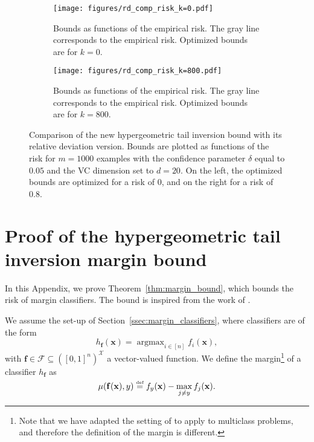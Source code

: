 \documentclass[twoside,11pt]{article}
\newcommand{\F}{\mathcal{F}}
\newcommand{\f}{\mathbf{f}}
\newcommand{\x}{\mathbf{x}}
\newcommand{\X}{\mathcal{X}}
\newcommand{\eqdef}{\overset{\smash{\mbox{\tiny \rm def}}}{=}}
\DeclareMathOperator*{\argmax}{argmax}
\begin{document}
\begin{figure}[h]
\centering
\begin{subfigure}[t]{0.485\textwidth}
    \centering
    \texttt{[image: figures/rd\_comp\_risk\_k=0.pdf]}
    \caption{Bounds as functions of the empirical risk. The gray line corresponds to the empirical risk. Optimized bounds are for $k=0$.}
    \label{fig:rd_comp_risk_k=0}
\end{subfigure}\hfill
\begin{subfigure}[t]{0.485\textwidth}
    \centering
    \texttt{[image: figures/rd\_comp\_risk\_k=800.pdf]}
    \caption{Bounds as functions of the empirical risk. The gray line corresponds to the empirical risk. Optimized bounds are for $k=800$.}
    \label{fig:rd_comp_risk_k=800}
\end{subfigure}
\caption{Comparison of the new hypergeometric tail inversion bound with its relative deviation version.
Bounds are plotted as functions of the risk for $m=1000$ examples with the confidence parameter $\delta$ equal to $0.05$ and the VC dimension set to $d=20$.
On the left, the optimized bounds are optimized for a risk of $0$, and on the right for a risk of $0.8$.}
\label{fig:rd_bounds_comparison}
\end{figure}









\clearpage



\section{Proof of the hypergeometric tail inversion margin bound}
\label{app:margin_bound}

In this Appendix, we prove Theorem~\ref{thm:margin_bound}, which bounds the risk of margin classifiers.
The bound is inspired from the work of \citet{anthonybartlett99}.

We assume the set-up of Section~\ref{ssec:margin_classifiers}, where classifiers are of the form 
\begin{equation*}
    h_\f(\x) = \argmax_{i\in[n]} f_i(\x),
\end{equation*}
with $\f \in \F \subseteq ([0,1]^n)^\X$ a vector-valued function.
We define the margin\footnote{Note that we have adapted the setting of \cite{anthonybartlett99} to apply to multiclass problems, and therefore the definition of the margin is different.}
of a classifier $h_\f$ as
\begin{equation*}
    \mu(\f(\x), y) \eqdef f_y(\x) - \max_{j\neq y} f_j(\x).
\end{equation*}
\end{document}
